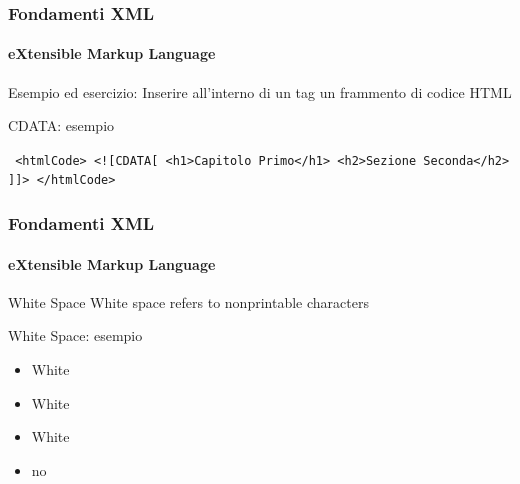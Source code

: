 \begin{frame}
    \frametitle{Fondamenti XML}
    \framesubtitle{eXtensible Markup Language}
    \addtocounter{nframe}{1}

	\begin{block}{Esempio ed esercizio:}
		Inserire all'interno di un tag un frammento di codice HTML
	\end{block}

	\begin{block}{CDATA: esempio}
		\begin{center}
			\texttt{
			<htmlCode>
			 <![CDATA[
			 		<h1>Capitolo Primo</h1>
			 		<h2>Sezione Seconda</h2>
			 	]]>
			 </htmlCode>
			 }
		\end{center}
	\end{block}

\end{frame}



\begin{frame}
    \frametitle{Fondamenti XML}
    \framesubtitle{eXtensible Markup Language}
    \addtocounter{nframe}{1}

	\begin{block}{White Space}
		White space refers to nonprintable characters
	\end{block}

	\begin{block}{White Space: esempio}
		\begin{itemize}
			\item White%
			\item White%
			\item White%
			\item no%
		\end{itemize}
	\end{block}

\end{frame}







